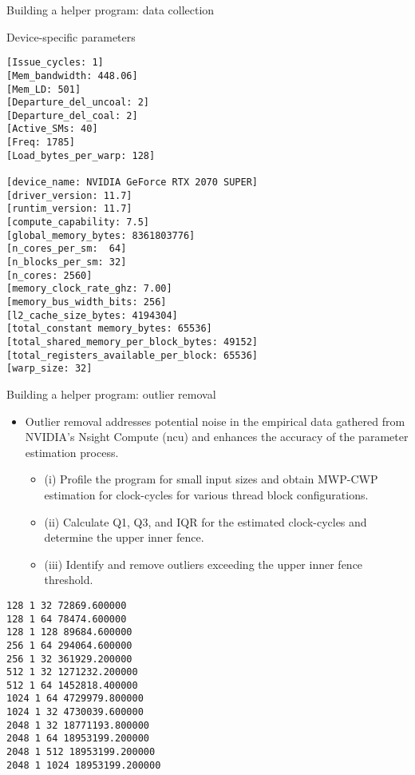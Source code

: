 \begin{frame}[fragile]{Building a helper program: data collection}
    \begin{block}{Device-specific parameters}
        {
            \begin{tcolorbox}
                \scriptsize
                \begin{verbatim}
[Issue_cycles: 1]
[Mem_bandwidth: 448.06]
[Mem_LD: 501]
[Departure_del_uncoal: 2]
[Departure_del_coal: 2]
[Active_SMs: 40]
[Freq: 1785]
[Load_bytes_per_warp: 128]

[device_name: NVIDIA GeForce RTX 2070 SUPER]
[driver_version: 11.7]
[runtim_version: 11.7]
[compute_capability: 7.5]
[global_memory_bytes: 8361803776]
[n_cores_per_sm:  64]
[n_blocks_per_sm: 32]
[n_cores: 2560]
[memory_clock_rate_ghz: 7.00]
[memory_bus_width_bits: 256]
[l2_cache_size_bytes: 4194304]
[total_constant memory_bytes: 65536]
[total_shared_memory_per_block_bytes: 49152]
[total_registers_available_per_block: 65536]
[warp_size: 32]
                \end{verbatim}
            \end{tcolorbox}
        }           
    \end{block}
\end{frame}

\begin{frame}[fragile]{Building a helper program: outlier removal}
    \begin{block}{}
        \begin{itemize}
            \item Outlier removal addresses potential noise in the empirical data gathered from NVIDIA’s Nsight Compute 
            (ncu) and enhances the accuracy of the parameter estimation process.
            \begin{itemize}
                \item (i) Profile the program for small input sizes and obtain MWP-CWP estimation for clock-cycles 
                for various thread block configurations.
                \item (ii) Calculate Q1, Q3, and IQR for the estimated clock-cycles and determine the upper inner fence.
                \item (iii) Identify and remove outliers exceeding the upper inner fence threshold.
            \end{itemize}
        \end{itemize}
        {
            \begin{tcolorbox}
                \scriptsize
                \begin{verbatim}
128 1 32 72869.600000
128 1 64 78474.600000
128 1 128 89684.600000
256 1 64 294064.600000
256 1 32 361929.200000
512 1 32 1271232.200000
512 1 64 1452818.400000
1024 1 64 4729979.800000
1024 1 32 4730039.600000
2048 1 32 18771193.800000
2048 1 64 18953199.200000
2048 1 512 18953199.200000
2048 1 1024 18953199.200000
                \end{verbatim}
            \end{tcolorbox}
        }
    \end{block}
\end{frame}

